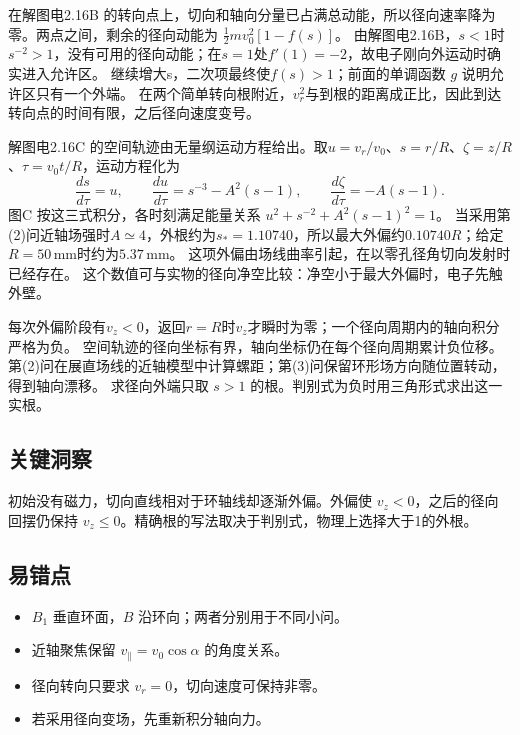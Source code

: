 \documentclass[UTF8,fontset=fandol,a4paper,11pt]{ctexart}
\begin{document}
在解图电2.16B 的转向点上，切向和轴向分量已占满总动能，所以径向速率降为零。两点之间，剩余的径向动能为 $\tfrac12m v_0^2[1-f(s)]$。
由解图电2.16B，$s<1$时$s^{-2}>1$，没有可用的径向动能；在$s=1$处$f'(1)=-2$，故电子刚向外运动时确实进入允许区。
继续增大s，二次项最终使$f(s)>1$；前面的单调函数 $g$ 说明允许区只有一个外端。
在两个简单转向根附近，$v_r^2$与到根的距离成正比，因此到达转向点的时间有限，之后径向速度变号。

解图电2.16C 的空间轨迹由无量纲运动方程给出。取$u=v_r/v_0$、$s=r/R$、$\zeta=z/R$、$\tau=v_0t/R$，运动方程化为
\[
\frac{ds}{d\tau}=u,\qquad
\frac{du}{d\tau}=s^{-3}-A^2(s-1),\qquad
\frac{d\zeta}{d\tau}=-A(s-1).
\]
图C 按这三式积分，各时刻满足能量关系 $u^2+s^{-2}+A^2(s-1)^2=1$。
当采用第(2)问近轴场强时$A\simeq4$，外根约为$s_*=1.10740$，所以最大外偏约$0.10740R$；给定$R=50\,\mathrm{mm}$时约为$5.37\,\mathrm{mm}$。
这项外偏由场线曲率引起，在以零孔径角切向发射时已经存在。
这个数值可与实物的径向净空比较：净空小于最大外偏时，电子先触外壁。

每次外偏阶段有$v_z<0$，返回$r=R$时$v_z$才瞬时为零；一个径向周期内的轴向积分严格为负。
空间轨迹的径向坐标有界，轴向坐标仍在每个径向周期累计负位移。
第(2)问在展直场线的近轴模型中计算螺距；第(3)问保留环形场方向随位置转动，得到轴向漂移。
求径向外端只取 $s>1$ 的根。判别式为负时用三角形式求出这一实根。




\subsection*{关键洞察}

初始没有磁力，切向直线相对于环轴线却逐渐外偏。外偏使 $v_z<0$，之后的径向回摆仍保持 $v_z\le0$。精确根的写法取决于判别式，物理上选择大于1的外根。



\subsection*{易错点}

\begin{itemize}
\item $B_1$ 垂直环面，$B$ 沿环向；两者分别用于不同小问。
\item 近轴聚焦保留 $v_\parallel=v_0\cos\alpha$ 的角度关系。
\item 径向转向只要求 $v_r=0$，切向速度可保持非零。
\item 若采用径向变场，先重新积分轴向力。
\end{itemize}
\end{document}
